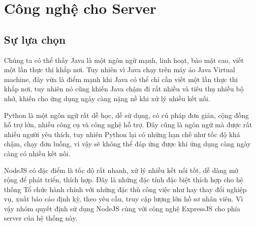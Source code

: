 \section{Công nghệ cho Server}



\subsection{Sự lựa chọn}
Chúng ta có thể thấy Java là một ngôn ngữ mạnh, linh hoạt, bảo mật cao, viết một lần thực thi khắp nơi. Tuy nhiên vì Java chạy trên máy ảo Java Virtual machine, đây vừa là điểm mạnh khi Java có thể chỉ cần viết một lần thực thi khắp nơi, tuy nhiên nó cũng khiến Java chậm đi rất nhiều và tiêu thụ nhiều bộ nhớ, khiến cho ứng dụng ngày càng nặng nề khi xử lý nhiều kết nối.

Python là một ngôn ngữ rất dễ học, dễ sử dụng, có cú pháp đơn giản, cộng đồng hỗ trợ lớn, nhiều công cụ và công nghệ hỗ trợ. Đây cũng là ngôn ngữ mà được rất nhiều người yêu thích, tuy nhiên Python lại có những hạn chế như tốc độ khá chậm, chạy đơn luồng, vì vậy sẽ không thể đáp ứng được khi ứng dụng càng ngày càng có nhiều kết nối.

NodeJS có đặc điểm là tốc độ rất nhanh, xử lý nhiều kết nối tốt, dễ dàng mở rộng để phát triển, thích hợp. Đây là những đặc tính đặc biệt thích hợp cho hệ thống Tổ chức hành chính với những đặc thù công việc như hay thay đổi nghiệp vụ, xuất báo cáo định kỳ, theo yêu cầu, truy cập lượng lớn hồ sơ nhân viên. Vì vậy nhóm quyết định sử dụng NodeJS cùng với công nghệ ExpressJS cho phía server của hệ thống này.